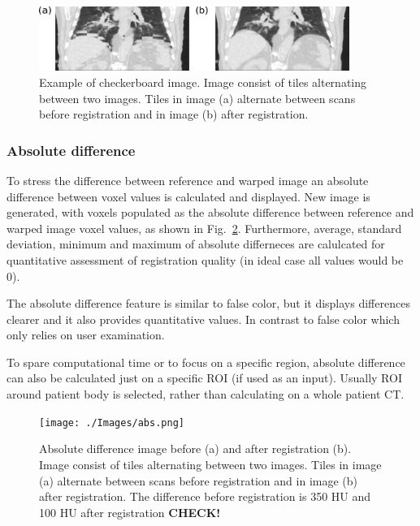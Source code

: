 \documentclass[type=dr, dr=rernat, accentcolor=tud7b,colorbacktitle, bigchapter, openright, twoside, 12pt ]{tudthesis}
\begin{document}
\begin{figure}[H]
	\begin{center}		
		\includegraphics[width=0.9\textwidth]{./Images/checkerboard.png}
		\caption{Example of checkerboard image. Image consist of tiles alternating between two images. Tiles in image (a) alternate between scans before registration and in image (b) after registration.}
		\label{checkerboard}
	\end{center}
\end{figure}

\subsubsection{Absolute difference} 

To stress the difference between reference and warped image an absolute difference between voxel values is calculated and displayed. New image is generated, with voxels populated as the absolute difference between reference and warped image voxel values, as shown in Fig.~\ref{absDiff}. Furthermore, average, standard deviation, minimum and maximum of absolute differneces are calulcated for quantitative assessment of registration quality (in ideal case all values would be 0).

The absolute difference feature is similar to false color, but it displays differences clearer and it also provides quantitative values. In contrast to false color which only relies on user examination.

To spare computational time or to focus on a specific region, absolute difference can also be calculated just on a specific ROI (if used as an input). Usually ROI around patient body is selected, rather than calculating on a whole patient CT.

\begin{figure}[H]
	\begin{center}		
		\texttt{[image: ./Images/abs.png]}
		\caption{Absolute difference image before (a) and after registration (b).  Image consist of tiles alternating between two images. Tiles in image (a) alternate between scans before registration and in image (b) after registration. The difference before registration is 350 HU and 100 HU after registration \textbf{CHECK!}}
		\label{absDiff}
	\end{center}
\end{figure}
\end{document}
